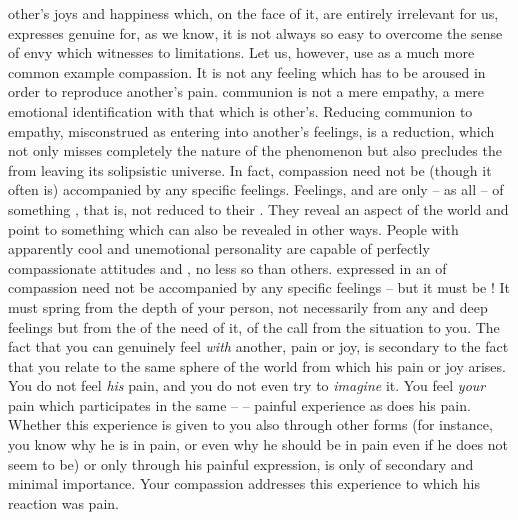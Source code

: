  other's joys and happiness which, on the face of it, are entirely
irrelevant for us, expresses genuine  for, as we know, it is not
always so easy to overcome the sense of envy which witnesses to 
limitations.  Let us, however, use as a much more common example 
compassion. It is not any feeling which has to be aroused in order to reproduce
another's pain.   communion is not a mere empathy, a mere emotional
identification with that which is other's.  Reducing  communion to
empathy, misconstrued as entering into another's feelings, is a
 reduction, which not only misses completely the nature of
the phenomenon but also precludes the  from leaving its solipsistic
universe. In fact, compassion need not be (though it often is) accompanied by
any specific feelings. Feelings,  and  are only
 -- as all  -- of something , that is, not
reduced to their . They reveal an aspect of the world
and point to something which can also be revealed in other ways. People with
apparently cool and unemotional personality are capable of perfectly
compassionate attitudes and , no less so than others.  
expressed in an  of compassion need not be accompanied by any specific
feelings -- but it must be ! It must spring from the depth of your
person, not necessarily from any  and deep feelings but from the
 of the need of it, of the call from the  situation
to you.  The fact that you can genuinely feel {\em with} another, pain or joy,
is secondary to the fact that you relate to the same sphere of the world from
which his pain or joy arises. You do not feel {\em his} pain, and you do not
even try to {\em imagine} it. You feel {\em your} pain which participates in the
same --  -- painful experience as does his pain. Whether this
experience is given to you also through other forms (for instance, you know why
he is in pain, or even why he should be in pain even if he does not seem to be)
or only through his painful expression, is only of secondary and minimal
importance. Your compassion addresses this experience to which his reaction was
pain.

